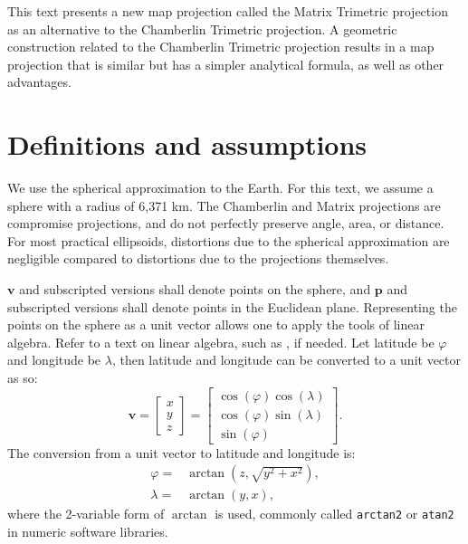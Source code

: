 \documentclass[]{interact}
\begin{document}
This text presents a new map projection called the Matrix Trimetric projection
as an alternative to the Chamberlin Trimetric projection. A geometric
construction related to the Chamberlin Trimetric projection results in a map
projection that is similar but has a simpler analytical formula,
as well as other advantages.

\section{Definitions and assumptions}
We use the spherical approximation to the Earth. For this text, we assume a
sphere with a radius of 6,371 km. The Chamberlin and Matrix projections are
compromise projections, and do not perfectly preserve angle, area, or distance.
For most practical ellipsoids, distortions due to the spherical approximation
are negligible compared to distortions due to the projections themselves.

$\mathbf v$ and subscripted versions shall denote points on the sphere, and
$\mathbf p$ and subscripted versions shall denote points in the Euclidean plane.
Representing the points on the sphere as a unit vector allows one to apply the
tools of linear algebra. Refer to a text on linear algebra, such as
\citet{strang80}, if needed. Let latitude be $\varphi$ and longitude be
$\lambda$, then latitude and longitude can be converted to a unit vector as so:
\citep{kent}
\begin{equation}
\mathbf v =
\begin{bmatrix*}
  x \\y\\ z
\end{bmatrix*}
=
\begin{bmatrix*}
 \cos(\varphi) \cos(\lambda) \\
 \cos(\varphi) \sin(\lambda) \\
 \sin(\varphi)
\end{bmatrix*}.
\end{equation}
The conversion from a unit vector to latitude and longitude is:
\begin{equation}\begin{split}
  \varphi =& \arctan\left(z, \sqrt{y^2 + x^2}\right), \\
  \lambda =& \arctan\left(y, x\right),
\end{split}\end{equation}
where the 2-variable form of $\arctan$ is used, commonly called \texttt{arctan2}
or \texttt{atan2} in numeric software libraries.
\end{document}
